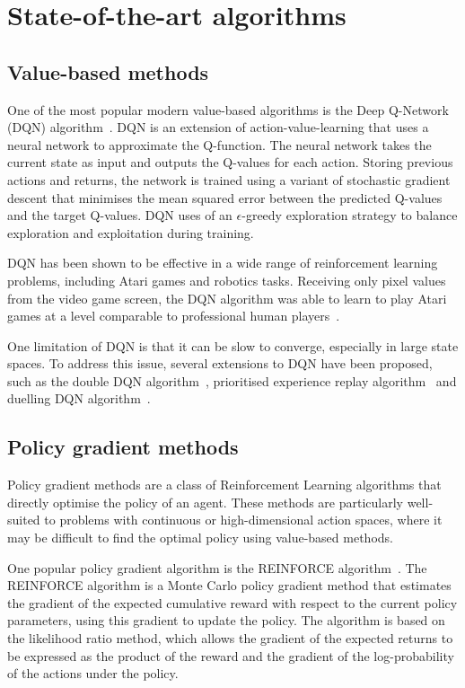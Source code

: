 \section{State-of-the-art algorithms}
\label{sec:rl_algs}

\subsection{Value-based methods}
One of the most popular modern value-based algorithms is the Deep Q-Network (DQN) algorithm~\autocite{mnih2013}.
DQN is an extension of action-value-learning that uses a neural network to approximate the Q-function.
The neural network takes the current state as input and outputs the Q-values for each action.
Storing previous actions and returns, the network is trained using a variant of stochastic gradient descent that minimises the mean squared error between the predicted Q-values and the target Q-values.
DQN uses of an $\epsilon$-greedy exploration strategy to balance exploration and exploitation during training.

DQN has been shown to be effective in a wide range of reinforcement learning problems, including Atari games and robotics tasks.
Receiving only pixel values from the video game screen, the DQN algorithm was able to learn to play Atari games at a level comparable to professional human players~\autocite{mnih2015}.

One limitation of DQN is that it can be slow to converge, especially in large state spaces.
To address this issue, several extensions to DQN have been proposed, such as the double DQN algorithm~\autocite{hasselt2016}, prioritised experience replay algorithm~\autocite{schaul2015} and duelling DQN algorithm~\autocite{wang2016}.

\subsection{Policy gradient methods}
Policy gradient methods are a class of Reinforcement Learning algorithms that directly optimise the policy of an agent.
These methods are particularly well-suited to problems with continuous or high-dimensional action spaces, where it may be difficult to find the optimal policy using value-based methods.

One popular policy gradient algorithm is the REINFORCE algorithm~\autocite{williams1992}.
The REINFORCE algorithm is a Monte Carlo policy gradient method that estimates the gradient of the expected cumulative reward with respect to the current policy parameters, using this gradient to update the policy.
The algorithm is based on the likelihood ratio method, which allows the gradient of the expected returns to be expressed as the product of the reward and the gradient of the log-probability of the actions under the policy.

